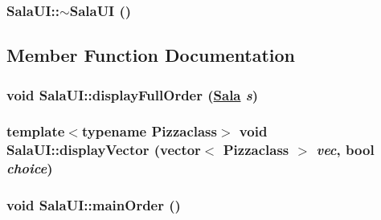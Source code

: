 \hypertarget{class_sala_u_i_5ec383a7722b1f6b7425e115471dbfdf}{
\subsubsection[$\sim$SalaUI]{\setlength{\rightskip}{0pt plus 5cm}Sala\-UI::$\sim$Sala\-UI ()}}
\label{class_sala_u_i_5ec383a7722b1f6b7425e115471dbfdf}




\subsection{Member Function Documentation}
\hypertarget{class_sala_u_i_ffacd1a3478484249d40a5ed5dc731da}{
\subsubsection[displayFullOrder]{\setlength{\rightskip}{0pt plus 5cm}void Sala\-UI::display\-Full\-Order (\hyperlink{class_sala}{Sala} {\em s})}}
\label{class_sala_u_i_ffacd1a3478484249d40a5ed5dc731da}


\hypertarget{class_sala_u_i_4ea2f17c1ceb659e1244e7d7330cdee5}{
\subsubsection[displayVector]{\setlength{\rightskip}{0pt plus 5cm}template$<$typename Pizzaclass$>$ void Sala\-UI::display\-Vector (vector$<$ Pizzaclass $>$ {\em vec}, bool {\em choice})}}
\label{class_sala_u_i_4ea2f17c1ceb659e1244e7d7330cdee5}


\hypertarget{class_sala_u_i_d30e21f7319d652c2a2fd88dc274cfbc}{
\subsubsection[mainOrder]{\setlength{\rightskip}{0pt plus 5cm}void Sala\-UI::main\-Order ()}}
\label{class_sala_u_i_d30e21f7319d652c2a2fd88dc274cfbc}




